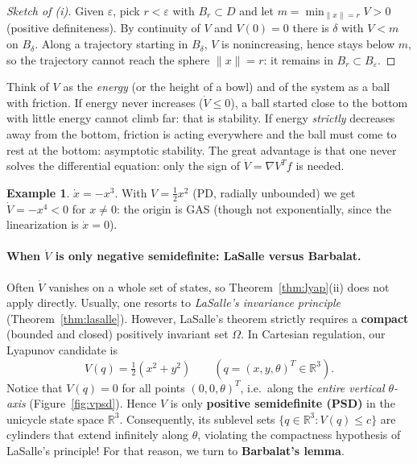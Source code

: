 \documentclass[11pt,a4paper]{article}
\def\bm#1{#1}%
\newcommand{\R}{\mathbb{R}}
\theoremstyle{definition}
\newtheorem{example}[definition]{Example}
\theoremstyle{plain}
\theoremstyle{remark}
\begin{document}
\begin{proof}[Sketch of (i)]
Given $\varepsilon$, pick $r<\varepsilon$ with $B_r\subset D$ and let $m=\min_{\|\bm x\|=r}V>0$ (positive definiteness). By continuity of $V$ and $V(\bm 0)=0$ there is $\delta$ with $V<m$ on $B_\delta$. Along a trajectory starting in $B_\delta$, $V$ is nonincreasing, hence stays below $m$, so the trajectory cannot reach the sphere $\|\bm x\|=r$: it remains in $B_r\subset B_\varepsilon$.
\end{proof}

\begin{intuition}
Think of $V$ as the \emph{energy} (or the height of a bowl) and of the system as a ball with friction. If energy never increases ($\dot V\le0$), a ball started close to the bottom with little energy cannot climb far: that is stability. If energy \emph{strictly} decreases away from the bottom, friction is acting everywhere and the ball must come to rest at the bottom: asymptotic stability. The great advantage is that one never solves the differential equation: only the sign of $\dot V=\nabla V^T\bm f$ is needed.
\end{intuition}

\begin{example}\label{ex:cubic}
$\dot x=-x^3$. With $V=\frac12x^2$ (PD, radially unbounded) we get $\dot V=-x^4<0$ for $x\ne0$: the origin is GAS (though not exponentially, since the linearization is $\dot x=0$).
\end{example}

\paragraph{When $\dot V$ is only negative semidefinite: LaSalle versus Barbalat.}
Often $\dot V$ vanishes on a whole set of states, so Theorem~\ref{thm:lyap}(ii) does not apply directly. Usually, one resorts to \emph{LaSalle's invariance principle} (Theorem~\ref{thm:lasalle}). However, LaSalle's theorem strictly requires a \textbf{compact} (bounded and closed) positively invariant set $\Omega$.
In Cartesian regulation, our Lyapunov candidate is
\[
V(\bm q)=\tfrac{1}{2}(x^2+y^2)\qquad (\bm q=(x,y,\theta)^T\in\R^3).
\]
Notice that $V(\bm q)=0$ for all points $(0,0,\theta)^T$, i.e.\ along the \emph{entire vertical $\theta$-axis} (Figure~\ref{fig:vpsd}). Hence $V$ is only \textbf{positive semidefinite (PSD)} in the unicycle state space $\R^3$. Consequently, its sublevel sets $\{\bm q\in\R^3 : V(\bm q)\le c\}$ are cylinders that extend infinitely along $\theta$, violating the compactness hypothesis of LaSalle's principle! For that reason, we turn to \textbf{Barbalat's lemma}.
\end{document}

